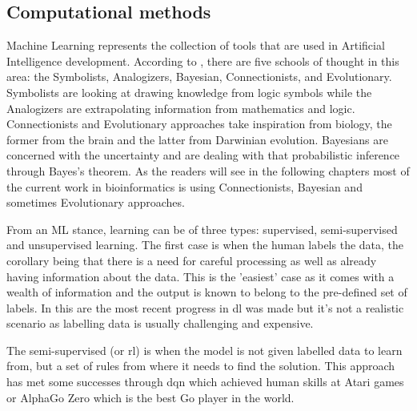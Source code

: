 \subsection{Computational methods} \label{s:lit:computational}

\vspace{3mm}
\vspace{3mm}

Machine Learning represents the collection of tools that are used in Artificial Intelligence development. According to \citet{Domingos_Pedro2015-xr}, there are five schools of thought in this area: the Symbolists, Analogizers, Bayesian, Connectionists, and Evolutionary. Symbolists are looking at drawing knowledge from logic symbols while the Analogizers are extrapolating information from mathematics and logic\cite{Domingos_Pedro2015-xr}. Connectionists and Evolutionary approaches take inspiration from biology, the former from the brain and the latter from Darwinian evolution. Bayesians are concerned with the uncertainty and are dealing with that probabilistic inference through Bayes's theorem\cite{Domingos_Pedro2015-xr}. As the readers will see in the following chapters most of the current work in bioinformatics is using Connectionists, Bayesian and sometimes Evolutionary approaches.

From an ML stance, learning can be of three types: supervised, semi-supervised and unsupervised learning. The first case is when the human labels the data, the corollary being that there is a need for careful processing as well as already having information about the data. This is the 'easiest' case as it comes with a wealth of information and the output is known to belong to the pre-defined set of labels. In this are the most recent progress in \acrfull{dl} was made but it's not a realistic scenario as labelling data is usually challenging and expensive. 

The semi-supervised (or \acrfull{rl}) is when the model is not given labelled data to learn from, but a set of rules from where it needs to find the solution. This approach has met some successes through \acrfull{dqn} which achieved human skills at Atari games\cite{Mnih2015-cw} or AlphaGo Zero\cite{Silver2017-sw} which is the best Go player in the world. 

